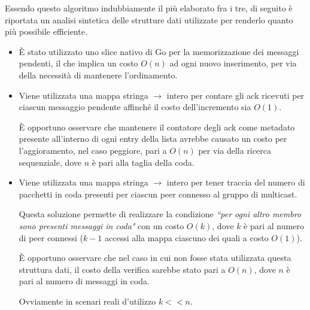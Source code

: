 \documentclass[conference]{IEEEtran}
\begin{document}
Essendo questo algoritmo indubbiamente il più elaborato fra i tre, di seguito è riportata un analisi sintetica delle strutture dati utilizzate per renderlo quanto più possibile efficiente.
\begin{itemize}
\item È stato utilizzato uno slice nativo di Go per la memorizzazione dei messaggi pendenti, il che implica un costo $O(n)$ ad ogni nuovo inserimento, per via della necessità di mantenere l'ordinamento.

\item Viene utilizzata una mappa stringa $\to$ intero per contare gli ack ricevuti per ciascun messaggio pendente affinché il costo dell'incremento sia $O(1)$.

È opportuno osservare che mantenere il contatore degli ack come metadato presente all'interno di ogni entry della lista avrebbe causato un costo per l'aggioramento, nel caso peggiore, pari a $O(n)$ per via della ricerca sequenziale, dove $n$ è pari alla taglia della coda.

\item Viene utilizzata una mappa stringa $\to$ intero per tener traccia del numero di pacchetti in coda presenti per ciascun peer connesso al gruppo di multicast.

Questa soluzione permette di realizzare la condizione \textit{``per ogni altro membro sono presenti messaggi in coda"} con un costo $O(k)$, dove $k$ è pari al numero di peer connessi ($k-1$ accessi alla mappa ciascuno dei quali a costo $O(1)$).

È opportuno osservare che nel caso in cui non fosse stata utilizzata questa struttura dati, il costo della verifica sarebbe stato pari a $O(n)$, dove $n$ è pari al numero di messaggi in coda.

Ovviamente in scenari reali d'utilizzo $k << n$.
\end{itemize}
\end{document}

